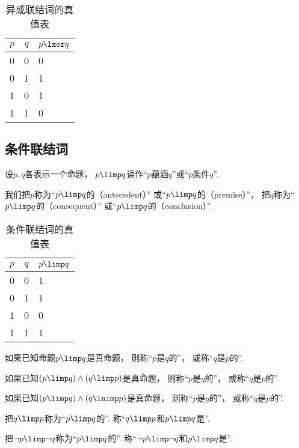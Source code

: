 \begin{table}[ht]
	\centering
	\begin{tabular}{|*{2}{c|}p{2cm}|}
		\hline
		\(p\) & \(q\) & \(p \lxor q\) \\
		\hline
		0 & 0 & 0 \\
		0 & 1 & 1 \\
		1 & 0 & 1 \\
		1 & 1 & 0 \\
		\hline
	\end{tabular}
	\caption{异或联结词的真值表}
\end{table}

\subsection{条件联结词}
设\(p,q\)各表示一个命题，
\(p \limp q\)读作“\(p\)蕴涵\(q\)”或“\(p\)条件\(q\)”.

我们把\(p\)称为“\(p \limp q\)的（antecedent）”
或“\(p \limp q\)的（premise）”，
把\(q\)称为“\(p \limp q\)的（consequent）”
或“\(p \limp q\)的（conclusion）”.

\begin{table}[ht]
	\centering
	\begin{tabular}{|*{2}{c|}p{2cm}|}
		\hline
		\(p\) & \(q\) & \(p \limp q\) \\
		\hline
		0 & 0 & 1 \\
		0 & 1 & 1 \\
		1 & 0 & 0 \\
		1 & 1 & 1 \\
		\hline
	\end{tabular}
	\caption{条件联结词的真值表}
\end{table}

如果已知命题\(p \limp q\)是真命题，
则称“\(p\)是\(q\)的”，
或称“\(q\)是\(p\)的”.

如果已知\((p \limp q) \land (q \limp p)\)是真命题，
则称“\(p\)是\(q\)的”，
或称“\(q\)是\(p\)的”.

如果已知\((p \limp q) \land (q \lnimp p)\)是真命题，
则称“\(p\)是\(q\)的”，
或称“\(q\)是\(p\)的”.

把\(q \limp p\)称为“\(p \limp q\)的”.
称“\(q \limp p\)和\(p \limp q\)是”.

把\(\neg p \limp \neg q\)称为“\(p \limp q\)的”.
称“\(\neg p \limp \neg q\)和\(p \limp q\)是”.

